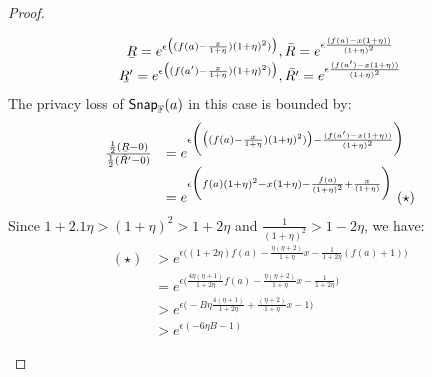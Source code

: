 \documentclass[a4paper,11pt]{article}
\begin{document}
\begin{proof}
\begin{itemize}
		\[
		\begin{array}{c}
		\ubar{R} = e^{\epsilon 
		\big( (f(a) -  \frac{x}{1 + \eta}) (1 + \eta)^2) \big)},
		\bar{R} = e^{\epsilon 
		\frac{(f(a) - x(1 + \eta))}{(1 + \eta)^2}}
		\\
		\ubar{R'} = e^{\epsilon 
		\big( (f(a') -  \frac{x}{1 + \eta}) (1 + \eta)^2) \big)},
		\bar{R'} = e^{\epsilon 
		\frac{(f(a') - x(1 + \eta))}{(1 + \eta)^2}}
		\end{array}
		\]
		The privacy loss of $\mathsf{Snap}_{\mathbb{F}}(a)$ in this case is bounded by:
		\[
		\begin{array}{ll}
		\frac
		{\frac{1}{2}(\ubar{R} - 0)}
		{\frac{1}{2}(\bar{R'} - 0)}
		& = e^{\epsilon
		\bigg(
		\big( (f(a) -  \frac{x}{1 + \eta}) (1 + \eta)^2) \big)
		-
		\frac{(f(a') - x(1 + \eta))}{(1 + \eta)^2}
		\bigg)}\\
		& = e^{\epsilon
		\bigg(
		f(a)(1 + \eta)^2 - x(1 + \eta) 
		- \frac{f(a)}{(1 + \eta)^2} + \frac{x}{(1 + \eta)}   
		\bigg)} ~ (\star)
		\end{array}
		\]
		Since $ 1 + 2.1\eta > (1 + \eta)^2 > 1 + 2\eta$ and $\frac{1}{(1 + \eta)^2} > 1 - 2 \eta$, we have:
		\[
		\begin{array}{ll}
		(\star) & > e^{\epsilon \big(
		(1 + 2\eta) f(a) - \frac{\eta(\eta + 2)}{1 + \eta} x
		- \frac{1}{1 + 2\eta}(f(a) + 1)
		\big)}\\
		& = e^{\epsilon\big(
		\frac{4\eta(\eta + 1)}{1 + 2\eta} f(a) 
		- \frac{\eta(\eta + 2)}{1 + \eta} x
		- \frac{1}{1 + 2\eta}		
		\big)}\\
		& > e^{\epsilon\big( -B \eta
		\frac{4(\eta + 1)}{1 + 2\eta} + \frac{(\eta + 2)}{1 + \eta} x - 1	
		\big)}\\
%
		& > e^{\epsilon(-6 \eta B - 1)}
		\end{array}
		\]
	\end{itemize}



\end{proof}


\newpage


\end{document}
